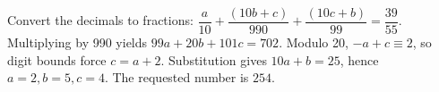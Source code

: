 Convert the decimals to fractions: $\dfrac{a}{10}+\dfrac{(10b+c)}{990}+\dfrac{(10c+b)}{99}=\dfrac{39}{55}$. Multiplying by 990 yields $99a+20b+101c=702$. Modulo 20, $-a+c\equiv2$, so digit bounds force $c=a+2$. Substitution gives $10a+b=25$, hence $a=2,b=5,c=4$. The requested number is $\boxed{254}$.

